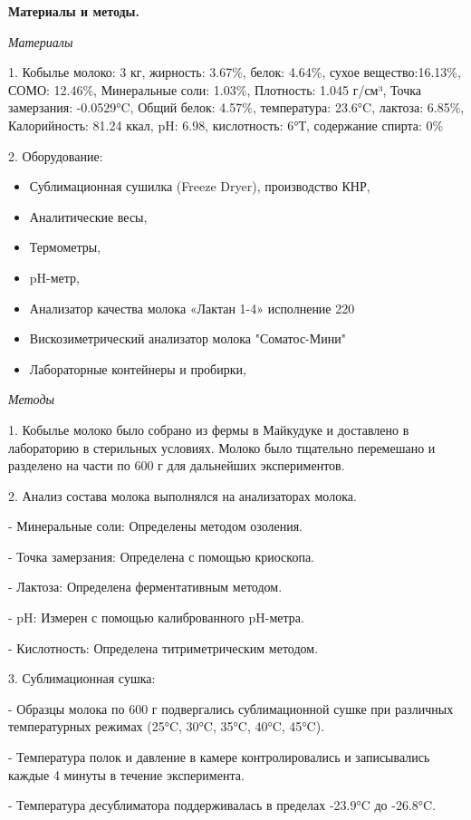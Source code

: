 {\bfseries Материалы и методы.}

\emph{Материалы}

1. Кобылье молоко: 3 кг, жирность: 3.67\%, белок: 4.64\%, сухое
вещество:16.13\%, СОМО: 12.46\%, Минеральные соли: 1.03\%, Плотность:
1.045 г/см³, Точка замерзания: -0.0529°C, Общий белок: 4.57\%,
температура: 23.6°C, лактоза: 6.85\%, Калорийность: 81.24 ккал, pH:
6.98, кислотность: 6°Т, содержание спирта: 0\%

2. Оборудование:

\begin{itemize}
\item
  Сублимационная сушилка (Freeze Dryer), производство КНР,
\item
  Аналитические весы,
\item
  Термометры,
\item
  pH-метр,
\item
  Анализатор качества молока «Лактан 1-4» исполнение 220
\item
  Вискозиметрический анализатор молока "Соматос-Мини"
\item
  Лабораторные контейнеры и пробирки,
\end{itemize}

\emph{Методы}

1. Кобылье молоко было собрано из фермы в Майкудуке и доставлено в
лабораторию в стерильных условиях. Молоко было тщательно перемешано и
разделено на части по 600 г для дальнейших экспериментов.

2. Анализ состава молока выполнялся на анализаторах молока.

- Минеральные соли: Определены методом озоления.

- Точка замерзания: Определена с помощью криоскопа.

- Лактоза: Определена ферментативным методом.

- pH: Измерен с помощью калиброванного pH-метра.

- Кислотность: Определена титриметрическим методом.

3. Сублимационная сушка:

- Образцы молока по 600 г подвергались сублимационной сушке при
различных температурных режимах (25°C, 30°C, 35°C, 40°C, 45°C).

- Температура полок и давление в камере контролировались и записывались
каждые 4 минуты в течение эксперимента.

- Температура десублиматора поддерживалась в пределах -23.9°C до
-26.8°C.

